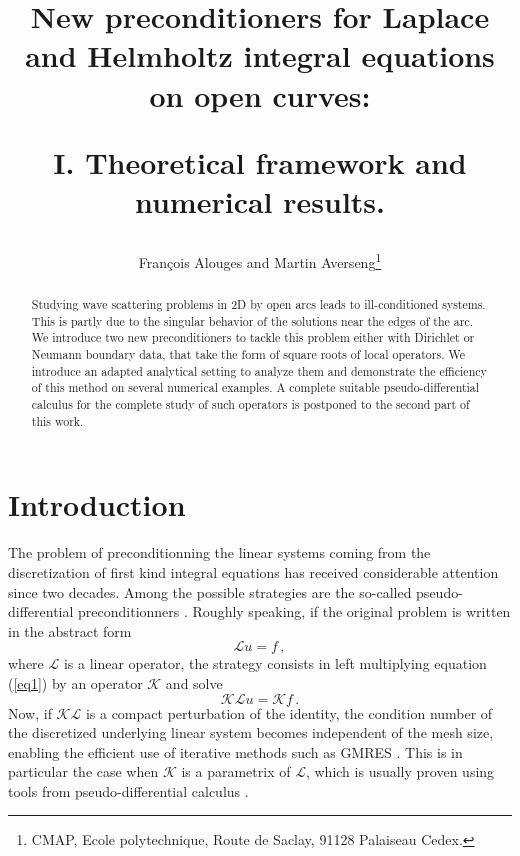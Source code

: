 \documentclass[a4paper]{article}
\title{New preconditioners for Laplace and Helmholtz integral equations on open curves: \\
	\vspace{0,5cm}
	\begin{Large}
		I. Theoretical framework and numerical results. 
	\end{Large}}
\author{Fran\c{c}ois Alouges and Martin Averseng\footnote{CMAP, Ecole polytechnique, Route de Saclay, 91128 Palaiseau Cedex.}}
\begin{document}
\maketitle
\begin{abstract}
Studying wave scattering problems in 2D by open arcs leads to ill-conditioned systems. This is partly due to the singular behavior
of the solutions near the edges of the arc. We introduce two new preconditioners to tackle this problem either with Dirichlet or Neumann 
boundary data, that take the form of square roots of local operators. We introduce an adapted analytical setting to analyze them and 
demonstrate the efficiency of this method on several numerical examples. A complete suitable pseudo-differential calculus for the
complete study of such operators is postponed to the second part of this work.
\end{abstract}

\section{Introduction}

The problem of preconditionning the linear systems coming from the discretization of first kind integral equations
has received considerable attention since two decades. Among the possible strategies are the so-called pseudo-differential 
preconditionners \cite{alouges2007stable,alouges2005new,antoine2007generalized,christiansen2002preconditioner,hiptmair2014mesh,Steinbach98}. 
Roughly speaking, if the original problem is written in the abstract form
\begin{equation}
	\mathcal{L}u=f\,,
	\label{eq1}
\end{equation}
where $\mathcal{L}$ is a linear operator, the strategy consists in left multiplying equation (\ref{eq1}) by an operator $\mathcal{K}$ and solve
\begin{equation}
	\mathcal{K}\mathcal{L}u=\mathcal{K}f\,.	
\end{equation}
Now, if $\mathcal{K}\mathcal{L}$ is a compact perturbation of the identity, the condition number of the discretized underlying linear system 
becomes independent of the mesh size, enabling the efficient use of iterative methods such as GMRES \cite{saad1986gmres}. This is in particular the 
case when $\mathcal{K}$ is a parametrix of $\mathcal{L}$, which is usually proven using tools from pseudo-differential calculus 
\cite{steinbach1998construction}.
\end{document}
